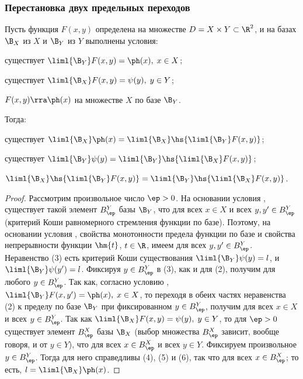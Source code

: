 \documentclass[a4paper]{article}
\begin{document}
\subsubsection{Перестановка двух предельных переходов}
\begin{theorem}
Пусть функция $F(x,y)$ определена на множестве $D=X\times
Y\subset\R^2$, и на базах $\B_X$ из $X$ и $\B_Y$ из $Y$ выполнены
условия: \begin{points}{-2}
          \item существует $\liml{\B_Y} F(x,y) = \ph(x), \; x\in X$;
          \item существует $\liml{\B_X} F(x,y) = \psi(y), \; y\in
          Y$;
          \item $F(x,y)\rra \ph(x)$ на множестве $X$ по базе $\B_Y$.
        \end{points}

Тогда: \begin{nums}{-2}\item существует $\liml{\B_X} \ph(x) =
\liml{\B_X} \hs{\liml{\B_Y} F(x,y)}$; \item существует $\liml{\B_Y}
\psi(y) = \liml{\B_Y} \hs{\liml{\B_X} F(x,y)}$; \item $\liml{\B_X}
\hs{\liml{\B_Y} F(x,y)} = \liml{\B_Y} \hs{\liml{\B_X}
F(x,y)}$.\end{nums}
\end{theorem}

\begin{proof}
Рассмотрим произвольное число $\ep>0$. На основании условия ,
существует такой элемент $B_{\ep}^Y$ базы $\B_{Y}$, что
 для всех $x\in X$ и
всех $y,y'\in B_{\ep}^Y$ (критерий Коши равномерного стремления
функции по базе). Поэтому, на основании условия , свойства
монотонности предела функции по базе и свойства непрерывности
функции $\hm{t}$, $t\in\R$, имеем  для всех
$y,y'\in B_{\ep}^Y$. Неравенство (3) есть критерий Коши
существования $\liml{\B_Y} \psi(y)=l$, и $\liml{\B_Y} \psi(y')=l$.
Фиксируя $y\in B_{\ep}^Y$ в (3), как и для (2), получим
 для любого $y\in B_{\ep}^Y$. Так как, согласно условию
, $\liml{\B_Y} F(x,y')=\ph(x), \; x\in X$, то переходя в обеих
частях неравенства (2) к пределу по базе $\B_Y$ при фиксированном
$y\in B_{\ep}^Y$, получим  для всех $x\in X$ и всех
$y\in B_{\ep}^Y$. Так как $\liml{\B_X} F(x,y) = \psi(y), \; y\in Y$,
то для $\ep>0$ существует элемент $B_{\ep}^X$ базы $\B_X$ (выбор
множества $B_{\ep}^X$ зависит, вообще говоря, и от $y\in Y$), что
 для всех $x\in B_{\ep}^X$ и
всех $y\in Y$. Фиксируем произвольное $y\in B_{\ep}^Y$. Тогда для
него справедливы (4), (5) и (6), так что  для всех $x\in
B_{\ep}^X$; то есть, $l=\liml{\B_X}\ph(x)$.
\end{proof}
\end{document}
